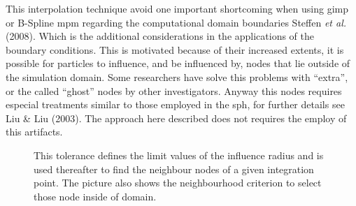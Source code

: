\documentclass[preprint,12pt,a4paper]{elsarticle}
\begin{document}
This interpolation technique avoid one important shortcoming when using
\acrshort{gimp} or B-Spline \acrshort{mpm} regarding the computational domain boundaries
Steffen {\it et al.} (2008)\cite{Steffen2008b}. Which is the
additional considerations in the applications of the boundary
conditions. This is motivated because of their increased extents, it
is possible for particles to influence, and be influenced by, nodes
that lie outside of the simulation domain. Some researchers have solve
this problems with ``extra'', or the called ``ghost'' nodes by other investigators. Anyway this nodes requires especial treatments similar
to those employed in the \acrfull{sph}, for
further details see Liu \& Liu (2003)\cite{Liu2003}. The approach here
described does not requires the employ of this artifacts.
\begin{figure}\sidecaption
  \centering
  \caption{This tolerance defines the limit values of the influence
    radius and is used thereafter to find the neighbour nodes of a
    given integration point. The picture also shows the neighbourhood
    criterion to select those node inside of \gls{domain}.} 
  \label{fig:Particle-discretization}
\end{figure}
\end{document}

